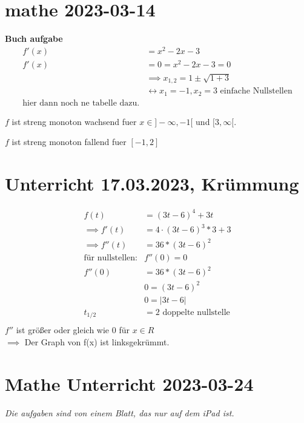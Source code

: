 \documentclass{report}
\begin{document}
\section{mathe 2023-03-14}
\textbf{Buch aufgabe}
\begin{align*}
    f'(x)&= x^2-2x-3\\
    f'(x)&=0=x^2-2x-3=0\\
         &\implies x_{1,2}=1\pm \sqrt{1+3}\\
         &\leftrightarrow x_1 = -1, x_2=\text{3 einfache Nullstellen}\\
         \text{hier dann noch ne tabelle dazu.}
\end{align*}

$f$ ist streng monoton wachsend fuer $x \in]-\infty, -1[$ und $[3,\infty [$.

$f$ ist streng monoton fallend fuer $[-1,2]$


\section{Unterricht 17.03.2023, Krümmung}

\begin{align*}
  f(t)&=(3t-6)^4+3t\\
  \implies f'(t)&=4\cdot (3t-6)^3*3+3\\
  \implies f''(t)&=36* (3t-6)^2\\
  \text{für nullstellen:} &f''(0)=0\\
  f''(0)&=36*(3t-6)^2\\
  &0=(3t-6)^2\\
  &0=|3t-6|\\
  t_{1/2}&=2 \text{ doppelte nullstelle}\\
\end{align*}
$f''$ ist größer oder gleich wie 0 für $x \in R$\\
$\implies$ Der Graph von f(x) ist linksgekrümmt.

\section{Mathe Unterricht 2023-03-24}

\textit{Die aufgaben sind von einem Blatt, das nur auf dem iPad ist.}\\
\end{document}
